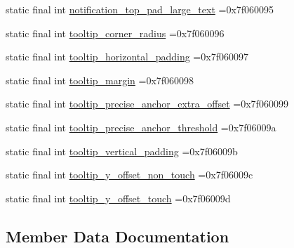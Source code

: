 \begin{DoxyCompactItemize}
\item 
static final int \mbox{\hyperlink{classbr_1_1unb_1_1cic_1_1mp_1_1marketmaster_1_1test_1_1R_1_1dimen_a96cbfdb37a9e65e0831ffbbf888729e3}{notification\+\_\+top\+\_\+pad\+\_\+large\+\_\+text}} =0x7f060095
\item 
static final int \mbox{\hyperlink{classbr_1_1unb_1_1cic_1_1mp_1_1marketmaster_1_1test_1_1R_1_1dimen_a59ff31b6110c10cc79f729b7e006a27a}{tooltip\+\_\+corner\+\_\+radius}} =0x7f060096
\item 
static final int \mbox{\hyperlink{classbr_1_1unb_1_1cic_1_1mp_1_1marketmaster_1_1test_1_1R_1_1dimen_a4f93d2e5ff11104c79c8d1a236a0eb86}{tooltip\+\_\+horizontal\+\_\+padding}} =0x7f060097
\item 
static final int \mbox{\hyperlink{classbr_1_1unb_1_1cic_1_1mp_1_1marketmaster_1_1test_1_1R_1_1dimen_a51ea77c58dc70287bb9aec63b8636755}{tooltip\+\_\+margin}} =0x7f060098
\item 
static final int \mbox{\hyperlink{classbr_1_1unb_1_1cic_1_1mp_1_1marketmaster_1_1test_1_1R_1_1dimen_a8e6dd26620eee832b5152bc1a8d4108c}{tooltip\+\_\+precise\+\_\+anchor\+\_\+extra\+\_\+offset}} =0x7f060099
\item 
static final int \mbox{\hyperlink{classbr_1_1unb_1_1cic_1_1mp_1_1marketmaster_1_1test_1_1R_1_1dimen_a84fe37e9eb485bbfc8a820789e5b1496}{tooltip\+\_\+precise\+\_\+anchor\+\_\+threshold}} =0x7f06009a
\item 
static final int \mbox{\hyperlink{classbr_1_1unb_1_1cic_1_1mp_1_1marketmaster_1_1test_1_1R_1_1dimen_a6e06cb14ffc713b5093d016d31299335}{tooltip\+\_\+vertical\+\_\+padding}} =0x7f06009b
\item 
static final int \mbox{\hyperlink{classbr_1_1unb_1_1cic_1_1mp_1_1marketmaster_1_1test_1_1R_1_1dimen_a37c3834c9b6245cb9cdd68302a189b61}{tooltip\+\_\+y\+\_\+offset\+\_\+non\+\_\+touch}} =0x7f06009c
\item 
static final int \mbox{\hyperlink{classbr_1_1unb_1_1cic_1_1mp_1_1marketmaster_1_1test_1_1R_1_1dimen_ac3a87bb2a84970b3df9b3af02452b4a6}{tooltip\+\_\+y\+\_\+offset\+\_\+touch}} =0x7f06009d
\end{DoxyCompactItemize}


\subsection{Member Data Documentation}
\mbox{\label{classbr_1_1unb_1_1cic_1_1mp_1_1marketmaster_1_1test_1_1R_1_1dimen_a062e9d3fe8c2b1598f3e48817e9e8a0f}} 
